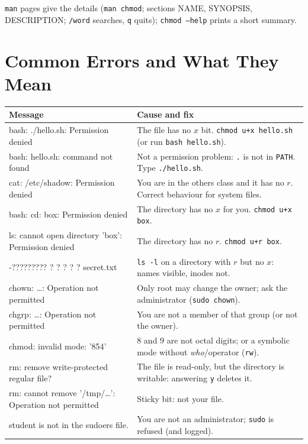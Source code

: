 \documentclass[11pt,a4paper]{article}
\newcommand{\cmd}[1]{\texttt{#1}}
\begin{document}
\cmd{man} pages give the details (\cmd{man chmod}; sections NAME, SYNOPSIS, DESCRIPTION; \texttt{/word} searches, \texttt{q} quits); \cmd{chmod --help} prints a short summary.

\section{Common Errors and What They Mean}

\begin{center}
\small
\begin{tabularx}{\linewidth}{@{}>{\ttfamily\raggedright\arraybackslash}p{5.3cm} X@{}}
\toprule
\textbf{\normalfont Message} & \textbf{Cause and fix} \\
\midrule
bash: ./hello.sh: Permission denied & The file has no $x$ bit. \cmd{chmod u+x hello.sh} (or run \cmd{bash hello.sh}). \\
bash: hello.sh: command not found & Not a permission problem: \texttt{.} is not in \texttt{PATH}. Type \cmd{./hello.sh}. \\
cat: /etc/shadow: Permission denied & You are in the others class and it has no $r$. Correct behaviour for system files. \\
bash: cd: box: Permission denied & The directory has no $x$ for you. \cmd{chmod u+x box}. \\
ls: cannot open directory 'box': Permission denied & The directory has no $r$. \cmd{chmod u+r box}. \\
-????????? ? ? ? ? ? secret.txt & \cmd{ls -l} on a directory with $r$ but no $x$: names visible, inodes not. \\
chown: \dots: Operation not permitted & Only root may change the owner; ask the administrator (\cmd{sudo chown}). \\
chgrp: \dots: Operation not permitted & You are not a member of that group (or not the owner). \\
chmod: invalid mode: '854' & $8$ and $9$ are not octal digits; or a symbolic mode without \emph{who}/operator (\texttt{rw}). \\
rm: remove write-protected regular file? & The file is read-only, but the directory is writable: answering \texttt{y} deletes it. \\
rm: cannot remove '/tmp/\dots': Operation not permitted & Sticky bit: not your file. \\
student is not in the sudoers file. & You are not an administrator; \cmd{sudo} is refused (and logged). \\
\bottomrule
\end{tabularx}
\end{center}
\end{document}
